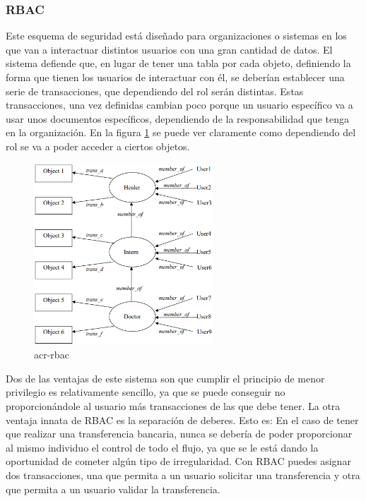 \documentclass[twoside, titlepage, 12pt, a4paper]{article}
\begin{document}
\subsubsection{\gls{RBAC}}
Este esquema de seguridad está diseñado para organizaciones o sistemas en los que van a interactuar distintos usuarios con una gran cantidad de datos. El sistema defiende que, en lugar de tener una tabla por cada objeto, definiendo la forma que tienen los usuarios de interactuar con él, se deberían establecer una serie de transacciones, que dependiendo del rol serán distintas. Estas transacciones, una vez definidas cambian poco porque un usuario específico va a usar unos documentos específicos, dependiendo de la responsabilidad que tenga en la organización. En la figura \ref{fig:RBAC} se puede ver claramente como dependiendo del rol se va a poder acceder a ciertos objetos.
\begin{figure}[H]
    \centering
    \includegraphics[width=0.6\textwidth]{Media/RBAC.PNG}
    \caption{\gls{acr-rbac}}
    \label{fig:RBAC}
\end{figure}
Dos de las ventajas de este sistema son que cumplir el principio de menor privilegio es relativamente sencillo, ya que se puede conseguir no proporcionándole  al usuario más transacciones de las que debe tener. La otra ventaja innata de \gls{RBAC} es la separación de deberes. Esto es: En el caso de tener que realizar una transferencia bancaria, nunca se debería de poder proporcionar al mismo individuo el control de todo el flujo, ya que se le está dando la oportunidad de cometer algún tipo de irregularidad. Con RBAC puedes asignar dos transacciones, una que permita a un usuario solicitar una transferencia y otra que permita a un usuario validar la transferencia.
\end{document}
